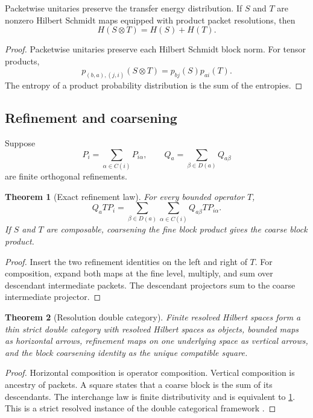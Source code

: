 \documentclass{aomart}
\newtheorem{theorem}{Theorem}[section]
\theoremstyle{definition}
\theoremstyle{remark}
\newcommand{\Rcite}[1]{\cite{#1}}
\begin{document}
\begin{proposition}\label{prop:entropy_properties}
Packetwise unitaries preserve the transfer energy distribution. If \(S\) and \(T\) are nonzero Hilbert Schmidt maps equipped with product packet resolutions, then
\[
 H(S\otimes T)=H(S)+H(T).
\]
\end{proposition}

\begin{proof}
Packetwise unitaries preserve each Hilbert Schmidt block norm. For tensor products,
\[
 p_{(b,a),(j,i)}(S\otimes T)
 =
 p_{bj}(S)p_{ai}(T).
\]
The entropy of a product probability distribution is the sum of the entropies.
\end{proof}

\subsection{Refinement and coarsening}

Suppose
\[
 P_i=\sum_{\alpha\in C(i)}P_{i\alpha},
 \qquad
 Q_a=\sum_{\beta\in D(a)}Q_{a\beta}
\]
are finite orthogonal refinements.

\begin{theorem}[Exact refinement law]\label{thm:exact_refinement}
For every bounded operator \(T\),
\[
 \boxed{
 Q_aTP_i
 =
 \sum_{\beta\in D(a)}
 \sum_{\alpha\in C(i)}
 Q_{a\beta}TP_{i\alpha}.
 }
\]
If \(S\) and \(T\) are composable, coarsening the fine block product gives the coarse block product.
\end{theorem}

\begin{proof}
Insert the two refinement identities on the left and right of \(T\). For composition, expand both maps at the fine level, multiply, and sum over descendant intermediate packets. The descendant projectors sum to the coarse intermediate projector.
\end{proof}

\begin{theorem}[Resolution double category]\label{thm:double_category}
Finite resolved Hilbert spaces form a thin strict double category with resolved Hilbert spaces as objects, bounded maps as horizontal arrows, refinement maps on one underlying space as vertical arrows, and the block coarsening identity as the unique compatible square.
\end{theorem}

\begin{proof}
Horizontal composition is operator composition. Vertical composition is ancestry of packets. A square states that a coarse block is the sum of its descendants. The interchange law is finite distributivity and is equivalent to \cref{thm:exact_refinement}. This is a strict resolved instance of the double categorical framework \Rcite{R13}.
\end{proof}
\end{document}
